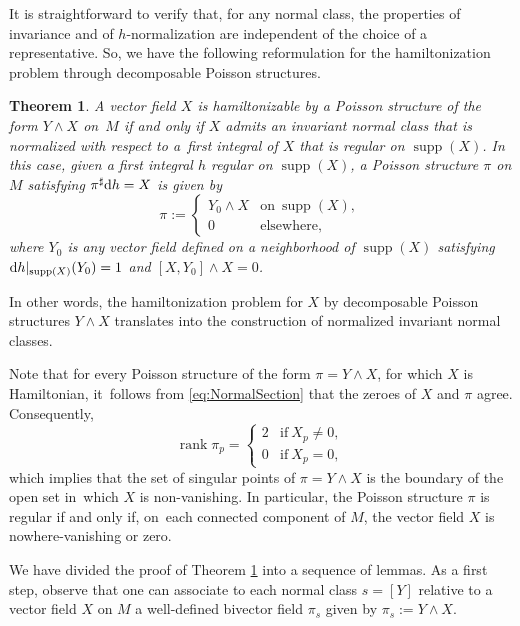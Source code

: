 \documentclass[pdftex]{sigma}%
\newcommand{\dd}{{\rm d}}
\numberwithin{equation}{section}
\newtheorem{Theorem}{Theorem}[section]
\begin{document}
It is straightforward to verify that, for any normal class, the properties of invariance and of $h$-normalization are independent of the choice of a representative. So, we have the following reformulation for the hamiltonization problem through decomposable Poisson structures.

\begin{Theorem}\label{teo:NormalSection}
A vector field $X$ is \emph{hamiltonizable} by a Poisson structure of the form $Y \wedge X$ on~$M$ if and only if $X$ admits an invariant normal class that is normalized with respect to a~first integral of $X$ that is regular on $\operatorname{supp}(X)$. In this case, given a first integral $h$ regular on $\operatorname{supp}(X)$, a Poisson structure $\pi$ on $M$ satisfying $\pi^{\sharp}\dd h=X$ is given by
 \begin{equation}\label{eq:NormalSection}
 \pi:=\begin{cases}
 Y_0\wedge X & \text{on} \  \operatorname{supp}(X),
 \\
 0 & \text{elsewhere},
 \end{cases}
 \end{equation}
where $Y_0$ is any vector field defined on a neighborhood of $\operatorname{supp}(X)$ satisfying $\dd h|_{\operatorname{supp}(X)}(Y_0)=1$ and $[X,Y_{0}] \wedge X = 0$.
\end{Theorem}

In other words, the hamiltonization problem for $X$ by decomposable Poisson structures $Y \wedge X$ translates into the construction of normalized invariant normal classes.

Note that for every Poisson structure of the form $\pi = Y \wedge X$, for which $X$ is Hamiltonian, it~follows from \eqref{eq:NormalSection} that the zeroes of $X$ and $\pi$ agree. Consequently,
 \begin{equation*}
 \operatorname{rank}{\pi_{p}} =
\begin{cases}
 2 & \text{if} \  X_{p} \neq 0,
 \\
 0 & \text{if} \  X_{p} = 0,
 \end{cases}
 \end{equation*}
which implies that the set of singular points of $\pi=Y\wedge X$ is the boundary of the open set in~which $X$ is non-vanishing. In particular, the Poisson structure $\pi$ is regular if and only if, on~each connected component of $M$, the vector field $X$ is nowhere-vanishing or zero.

We have divided the proof of Theorem \ref{teo:NormalSection} into a sequence of lemmas. As a first step, observe that one can associate to each normal class $s = [Y]$ relative to a vector field $X$ on $M$ a well-defined bivector field $\pi_{s}$ given by $\pi_{s} := Y \wedge X$.
\end{document}
